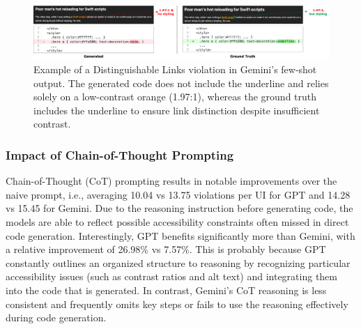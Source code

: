 \begin{figure}[htbp]
  \centering
  \includegraphics[width=1\linewidth]{figures/distinguishablecolorlinks.png}
  \caption{Example of a Distinguishable Links violation in Gemini’s few-shot output. The generated code does not include the underline and relies solely on a low-contrast orange (1.97:1), whereas the ground truth includes the underline to ensure link distinction despite insufficient contrast.}
  \label{fig:distinguishablecolorlinks} 
\end{figure}

\subsubsection{Impact of Chain-of-Thought Prompting}
Chain-of-Thought (CoT) prompting results in notable improvements 
over the naive prompt, i.e., averaging 10.04 vs 13.75 violations
per UI for GPT and 14.28 vs 15.45 for Gemini. Due to 
the reasoning instruction before generating code, 
the models are able to reflect possible accessibility 
constraints often missed in direct code generation.
Interestingly, GPT benefits significantly more 
than Gemini, with a relative improvement of 26.98\% vs 
7.57\%. This is probably because GPT constantly 
outlines an organized structure to reasoning by 
recognizing particular accessibility issues 
(such as contrast ratios and alt text) and integrating them into 
the code that is generated. In contrast, Gemini's 
CoT reasoning is less consistent and frequently omits 
key steps or fails to use the reasoning effectively 
during code generation.

